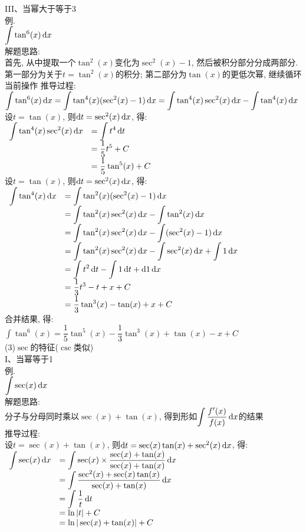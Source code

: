III、当幂大于等于3\\
例.\\
$\displaystyle\int\tan^6(x)\mathop{}\!\mathrm{d} x$\\
解题思路:\\
首先, 从中提取一个$\tan^2(x)$变化为$\sec^2(x)-1$, 然后被积分部分分成两部分. 第一部分为关于$t=\tan^2(x)$的积分; 第二部分为$\tan(x)$的更低次幂, 继续循环当前操作
推导过程:\\
$\displaystyle\int\tan^6(x)\mathop{}\!\mathrm{d} x=\int\tan^4(x)(\sec^2(x)-1)\mathop{}\!\mathrm{d} x=\int\tan^4(x)\sec^2(x)\mathop{}\!\mathrm{d} x-\int\tan^4(x)\mathop{}\!\mathrm{d} x$\\
设$t=\tan(x)$, 则$\mathop{}\!\mathrm{d} t=\sec^2(x)\mathop{}\!\mathrm{d} x$, 得:\\
$\begin{array}{>{\displaystyle}r >{\displaystyle}l}
\int\tan^4(x)\sec^2(x)\dif x & =\int t^4\dif t\\
& =\dfrac{1}{5}t^5+C\\[1ex]
& =\dfrac{1}{5}\tan^5(x)+C
\end{array}$\\[1ex]
设$t=\tan(x)$, 则$\mathop{}\!\mathrm{d} t=\sec^2(x)\mathop{}\!\mathrm{d} x$, 得:\\
$\begin{array}{>{\displaystyle}r >{\displaystyle}l}
\int\tan^4(x)\dif x & =\int\tan^2(x)(\sec^2(x)-1)\dif x\\
& =\int\tan^2(x)\sec^2(x)\dif x-\int\tan^2(x)\dif x\\
& =\int\tan^2(x)\sec^2(x)\dif x-\int(\sec^2(x)-1)\dif x\\
& =\int\tan^2(x)\sec^2(x)\dif x-\int\sec^2(x)\dif x+\int 1\dif x\\
& =\int t^2\dif t-\int 1\dif t+\dif 1\dif x\\
& =\dfrac{1}{3}t^3-t+x+C\\[1ex]
& =\dfrac{1}{3}\tan^3(x)-\tan(x)+x+C
\end{array}$\\[1ex]
合并结果, 得:\\
$\displaystyle\int\tan^6(x)=\dfrac{1}{5}\tan^5(x)-\dfrac{1}{3}\tan^3(x)+\tan(x)-x+C$\\[4ex]

(3)$\sec$的特征($\csc$类似)\\
I、当幂等于1\\
例.\\
$\displaystyle\int\sec(x)\mathop{}\!\mathrm{d} x$\\
解题思路:\\
分子与分母同时乘以$\sec(x)+\tan(x)$, 得到形如$\displaystyle\int\frac{f'(x)}{f(x)}\mathop{}\!\mathrm{d} x$的结果\\
推导过程:\\
设$t=\sec(x)+\tan(x)$, 则$\mathop{}\!\mathrm{d} t=\sec(x)\tan(x)+\sec^2(x)\mathop{}\!\mathrm{d} x$, 得:\\
$\begin{array}{>{\displaystyle}r >{\displaystyle}l}
\int\sec(x)\dif x & =\int\sec(x)\times\dfrac{\sec(x)+\tan(x)}{\sec(x)+\tan(x)}\dif x\\[1ex]
& =\int\dfrac{\sec^2(x)+\sec(x)\tan(x)}{\sec(x)+\tan(x)}\dif x\\[1ex]
& =\int\dfrac{1}{t}\dif t\\[1ex]
& =\ln|t|+C\\
& =\ln|\sec(x)+\tan(x)|+C
\end{array}$\\[2ex]

